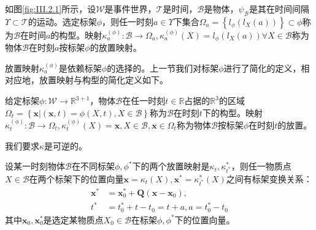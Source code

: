\documentclass[main.tex]{subfiles}
\begin{document}
\begin{definition}[构型]
如图\ref{fig:III.2.1}所示，设$\mathcal{W}$是事件世界，$\mathcal{T}$是时间，$\mathcal{B}$是物体，$\psi_\mathcal{B}$是其在时间间隔$\Upsilon\subset\mathcal{T}$的运动。选定标架$\phi$，则任一时刻$a\in\Upsilon$下集合$\Omega_a=\left\{l_\phi\left(l_X\left(a\right)\right)\right\}\subset \phi$称为$\mathcal{B}$在时间$a$的构型。映射$\kappa^{\left(\phi\right)}_a:\mathcal{B}\rightarrow\Omega_a,\kappa^{\left(\phi\right)}_a\left(X\right)=l_\phi\left(l_X\left(a\right)\right)\forall X\in\mathcal{B}$称为物体$\mathcal{B}$在时刻$a$按标架$\phi$的放置映射。
\end{definition}

放置映射$\kappa^{\left(\phi\right)}_a$是依赖标架$\phi$的选择的。上一节我们对标架$\phi$进行了简化的定义，相对应地，放置映射与构型的简化定义如下。

\begin{definition}[构型（简化）]
给定标架$\phi:\mathcal{W}\rightarrow\mathbb{R}^{3+1}$，物体$\mathcal{B}$在任一时刻$t\in\mathbb{R}$占据的$\mathbb{R}^3$的区域$\Omega_t=\left\{\mathbf{x}|\left(\mathbf{x},t\right)=\phi\left(X,t\right),X\in\mathcal{B}\right\}$称为$\mathcal{B}$在时刻$t$下的构型。映射$\kappa^{\left(\phi\right)}_t:\mathcal{B}\rightarrow\Omega_t,\kappa^{\left(\phi\right)}_t\left(X\right)=\mathbf{x},X\in\mathcal{B},\mathbf{x}\in\Omega_t$称为物体$\mathcal{B}$按标架$\phi$在时刻$t$的放置。
\end{definition}

我们要求$\kappa$是可逆的。

设某一时刻物体$\mathcal{B}$在不同标架$\phi,\phi^*$下的两个放置映射是$\kappa_t,\kappa_{t^*}^*$，则任一物质点$X\in\mathcal{B}$在两个标架下的位置向量$\mathbf{x}=\kappa_t\left(X\right),\mathbf{x}^*=\kappa_{t^*}^*\left(X\right)$之间有标架变换关系：
\begin{align*}
\mathbf{x}^*&=\mathbf{x}_0^*+\mathbf{Q}\left(\mathbf{x}-\mathbf{x}_0\right),\\
t^*&=t_0^*+t-t_0=t+a,a=t_0^*-t_0
\end{align*}
其中$\mathbf{x}_0,\mathbf{x}_0^*$是选定某物质点$X_0\in\mathcal{B}$在标架$\phi,\phi^*$下的位置向量。
\end{document}
